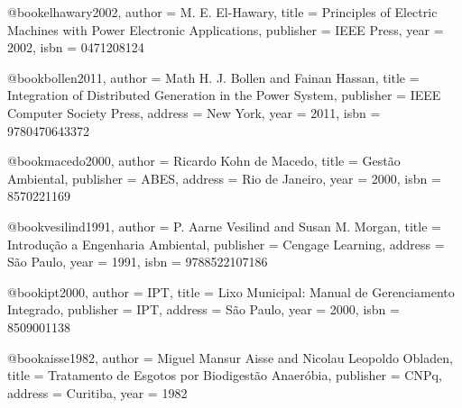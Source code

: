 @book{elhawary2002,
  author = {M. E. El-Hawary},
  title = {Principles of Electric Machines with Power Electronic Applications},
  publisher = {IEEE Press},
  year = {2002},
  isbn = {0471208124}
}

@book{bollen2011,
  author = {Math H. J. Bollen and Fainan Hassan},
  title = {Integration of Distributed Generation in the Power System},
  publisher = {IEEE Computer Society Press},
  address = {New York},
  year = {2011},
  isbn = {9780470643372}
}






@book{macedo2000,
  author = {Ricardo Kohn de Macedo},
  title = {Gestão Ambiental},
  publisher = {ABES},
  address = {Rio de Janeiro},
  year = {2000},
  isbn = {8570221169}
}

@book{vesilind1991,
  author = {P. Aarne Vesilind and Susan M. Morgan},
  title = {Introdução a Engenharia Ambiental},
  publisher = {Cengage Learning},
  address = {São Paulo},
  year = {1991},
  isbn = {9788522107186}
}

@book{ipt2000,
  author = {{IPT}},
  title = {Lixo Municipal: Manual de Gerenciamento Integrado},
  publisher = {IPT},
  address = {São Paulo},
  year = {2000},
  isbn = {8509001138}
}

@book{aisse1982,
  author = {Miguel Mansur Aisse and Nicolau Leopoldo Obladen},
  title = {Tratamento de Esgotos por Biodigestão Anaeróbia},
  publisher = {CNPq},
  address = {Curitiba},
  year = {1982}
}

